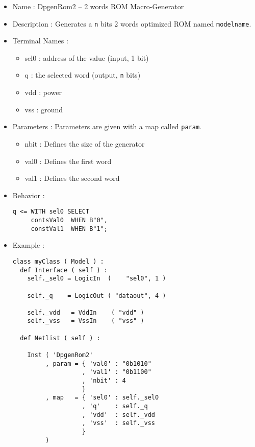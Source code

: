 \begin{itemize}
    \item Name : DpgenRom2 -- 2 words ROM Macro-Generator
    \item Description : Generates a \verb-n- bits 2 words optimized ROM named \verb-modelname-.
    \item Terminal Names :
    \begin{itemize}
        \item sel0 : address of the value (input, 1 bit)
        \item q : the selected word (output, \verb-n- bits)
        \item vdd : power
        \item vss : ground
    \end{itemize}
    \item Parameters : Parameters are given with a map called \verb-param-.
    \begin{itemize}
        \item nbit : Defines the size of the generator
        \item val0 : Defines the first word
        \item val1 : Defines the second word
    \end{itemize}
    \item Behavior :
\begin{verbatim}
q <= WITH sel0 SELECT
     contsVal0  WHEN B"0",
     constVal1  WHEN B"1";
\end{verbatim}
    \item Example :
\begin{verbatim}
class myClass ( Model ) :
  def Interface ( self ) :
    self._sel0 = LogicIn  (    "sel0", 1 )
    
    self._q    = LogicOut ( "dataout", 4 )
    
    self._vdd   = VddIn    ( "vdd" )
    self._vss   = VssIn    ( "vss" )
    
  def Netlist ( self ) :

    Inst ( 'DpgenRom2'
         , param = { 'val0' : "0b1010"
                   , 'val1' : "0b1100"
                   , 'nbit' : 4
                   }
         , map   = { 'sel0' : self._sel0
                   , 'q'    : self._q
                   , 'vdd'  : self._vdd
                   , 'vss'  : self._vss
                   }
         )   
\end{verbatim}
\end{itemize}
